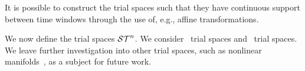 \begin{remark}
It is possible to construct the trial spaces such that they have continuous support between time windows through the 
use of, e.g., affine transformations.
\end{remark}
We now define the trial spaces $\mathcal{ ST }^{n}$. We consider \spatialAcronym\ trial spaces and \spaceTimeAcronym\ trial spaces. 
We leave further investigation into other trial spaces, such as nonlinear manifolds~\cite{leeCarlberg}, as a subject for future work.
